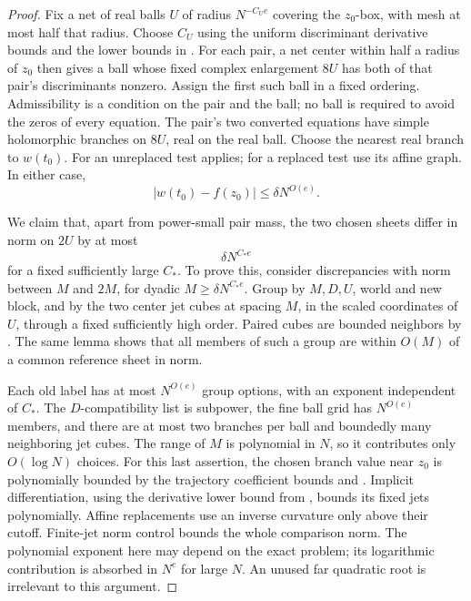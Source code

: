 \begin{proof}
Fix a net of real balls \(U\) of radius \(N^{-C_Ue}\) covering
the \(z_0\)-box, with mesh at most half that radius.  Choose
\(C_U\) using the uniform discriminant derivative bounds and the
lower bounds in .  For each pair,
a net center within half a radius of \(z_0\) then gives a ball
whose fixed complex enlargement \(8U\) has both of that pair's
discriminants nonzero.  Assign the first such ball in a fixed
ordering.  Admissibility is a condition on the pair and the ball;
no ball is required to avoid the zeros of every equation.
The pair's two converted equations have simple holomorphic
branches on \(8U\), real on the real ball.  Choose the nearest
real branch to \(w(t_0)\).
For an unreplaced test 
applies; for a replaced test use its affine graph.
In either case,
\begin{equation}
 |w(t_0)-f(z_0)|\le\delta N^{O(e)}.
 \label{a02:near-source-graph}
\end{equation}

We claim that, apart from power-small pair mass, the two
chosen sheets differ in norm on \(2U\) by at most
\begin{equation}
 \delta N^{C_*e}
 \label{a02:local-sheet-match}
\end{equation}
for a fixed sufficiently large \(C_*\).
To prove this, consider discrepancies with norm between
\(M\) and \(2M\), for dyadic \(M\ge\delta N^{C_*e}\).
Group by \(M,D,U\), world and new block, and by the two
center jet cubes at spacing \(M\), in the scaled coordinates
of \(U\), through a fixed sufficiently high order.
Paired cubes are bounded neighbors by
.  The same lemma shows that all
members of such a group are within \(O(M)\) of a common
reference sheet in norm.

Each old label has at most \(N^{O(e)}\) group options, with
an exponent independent of \(C_*\).  The \(D\)-compatibility
list is subpower, the fine ball grid has \(N^{O(e)}\) members,
and there are at most two branches per ball and boundedly
many neighboring jet cubes.  The range of \(M\) is polynomial
in \(N\), so it contributes only \(O(\log N)\) choices.
For this last assertion, the chosen branch value near
\(z_0\) is polynomially bounded by the trajectory coefficient
bounds and .  Implicit
differentiation, using the derivative lower bound from
, bounds its fixed jets
polynomially.  Affine replacements use an inverse curvature
only above their cutoff.  Finite-jet norm control bounds
the whole comparison norm.  The polynomial exponent here
may depend on the exact problem; its logarithmic contribution
is absorbed in \(N^e\) for large \(N\).  An unused far
quadratic root is irrelevant to this argument.


\end{proof}

